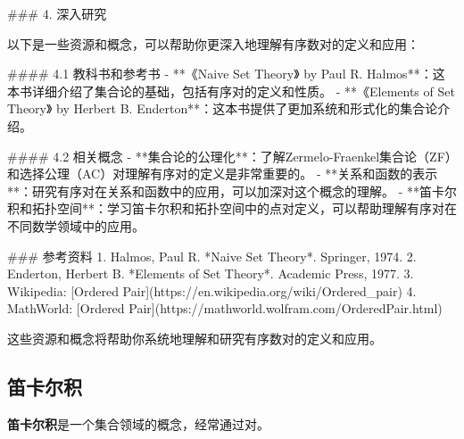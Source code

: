 ### 4. 深入研究

以下是一些资源和概念，可以帮助你更深入地理解有序数对的定义和应用：

#### 4.1 教科书和参考书
- **《Naive Set Theory》 by Paul R. Halmos**：这本书详细介绍了集合论的基础，包括有序对的定义和性质。
- **《Elements of Set Theory》 by Herbert B. Enderton**：这本书提供了更加系统和形式化的集合论介绍。

#### 4.2 相关概念
- **集合论的公理化**：了解Zermelo-Fraenkel集合论（ZF）和选择公理（AC）对理解有序对的定义是非常重要的。
- **关系和函数的表示**：研究有序对在关系和函数中的应用，可以加深对这个概念的理解。
- **笛卡尔积和拓扑空间**：学习笛卡尔积和拓扑空间中的点对定义，可以帮助理解有序对在不同数学领域中的应用。

### 参考资料
1. Halmos, Paul R. *Naive Set Theory*. Springer, 1974.
2. Enderton, Herbert B. *Elements of Set Theory*. Academic Press, 1977.
3. Wikipedia: [Ordered Pair](https://en.wikipedia.org/wiki/Ordered_pair)
4. MathWorld: [Ordered Pair](https://mathworld.wolfram.com/OrderedPair.html)

这些资源和概念将帮助你系统地理解和研究有序数对的定义和应用。
\subsection{笛卡尔积}

\textbf{笛卡尔积}是一个集合领域的概念，经常通过对。

